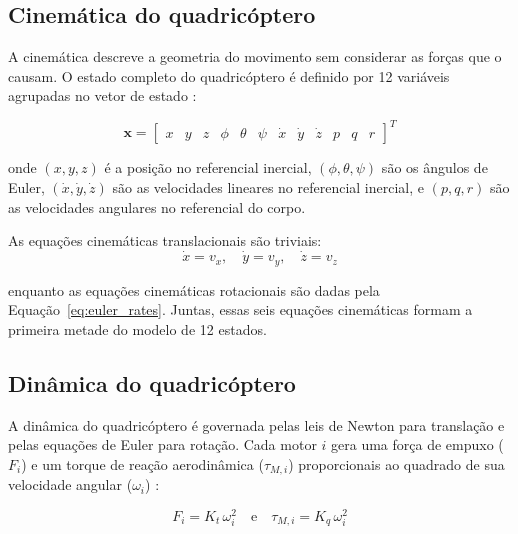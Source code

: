 \subsection{Cinemática do quadricóptero}\label{subsec:cinematica}

A cinemática descreve a geometria do movimento sem considerar as forças que o causam. O estado completo do quadricóptero é definido por 12 variáveis agrupadas no vetor de estado \cite{beard2012}:

\begin{equation}\label{eq:vetor_estado}
\mathbf{x} = \left[ \begin{array}{cccccccccccc} 
x & y & z & \phi & \theta & \psi & \dot{x} & \dot{y} & \dot{z} & p & q & r 
\end{array} \right]^T
\end{equation}

\noindent onde $(x, y, z)$ é a posição no referencial inercial, $(\phi, \theta, \psi)$ são os ângulos de Euler, $(\dot{x}, \dot{y}, \dot{z})$ são as velocidades lineares no referencial inercial, e $(p, q, r)$ são as velocidades angulares no referencial do corpo.

As equações cinemáticas translacionais são triviais:
\begin{equation}\label{eq:cine_trans}
\dot{x} = v_x, \quad \dot{y} = v_y, \quad \dot{z} = v_z
\end{equation}

\noindent enquanto as equações cinemáticas rotacionais são dadas pela Equação~\eqref{eq:euler_rates}. Juntas, essas seis equações cinemáticas formam a primeira metade do modelo de 12 estados.

\subsection{Dinâmica do quadricóptero}\label{subsec:dinamica}

A dinâmica do quadricóptero é governada pelas leis de Newton para translação e pelas equações de Euler para rotação. Cada motor $i$ gera uma força de empuxo ($F_i$) e um torque de reação aerodinâmica ($\tau_{M,i}$) proporcionais ao quadrado de sua velocidade angular ($\omega_i$) \cite{quan2017}:

\begin{equation}\label{eq:empuxo_torque_motor}
F_i = K_t \, \omega_i^2 \quad \text{e} \quad \tau_{M,i} = K_q \, \omega_i^2
\end{equation}

